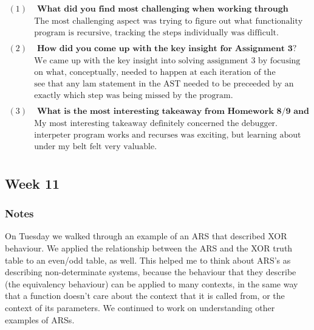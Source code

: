 \documentclass{article}
\theoremstyle{theorem}
\theoremstyle{definition}
\theoremstyle{remark}
\begin{document}
\[
\begin{aligned}
  (1)& \textbf{ What did you find most challenging when working through Homework 8/9 and Assignment 3?}\\
     &  \text{The most challenging aspect was trying to figure out what functionality the program lacked. Because the}\\ 
     &  \text{program is recursive, tracking the steps individually was difficult.}\\
     &\\
  (2)& \textbf{ How did you come up with the key insight for Assignment 3?}\\
     &  \text{We came up with the key insight into solving assignment 3 by focusing less on the the program and more}\\
     &  \text{on what, conceptually, needed to happen at each iteration of the evaluation process. This way, we could}\\
     &  \text{see that any lam statement in the AST needed to be preceeded by an app statement, and figure out }\\
     &  \text{exactly which step was being missed by the program.}\\
     &\\
  (3)& \textbf{ What is the most interesting takeaway from Homework 8/9 and Assignment 3?}\\
     &  \text{My most interesting takeaway definitely concerned the debugger. Conceptually learning more abot how an}\\
     &  \text{interpeter program works and recurses was exciting, but learning about another tool and getting it}\\
     &  \text{under my belt felt very valuable.}\\
\end{aligned}
\]

\subsection{Week 11}

\subsubsection*{Notes} On Tuesday we walked through an example of an ARS that described XOR behaviour. We applied the relationship between the ARS and the XOR truth table to an even/odd table, as well. This helped me to think about ARS's as describing non-determinate systems, because the behaviour that they describe (the equivalency behaviour) can be applied to many contexts, in the same way that a function doesn't care about the context that it is called from, or the context of its parameters. We continued to work on understanding other examples of ARSs. 
\end{document}
